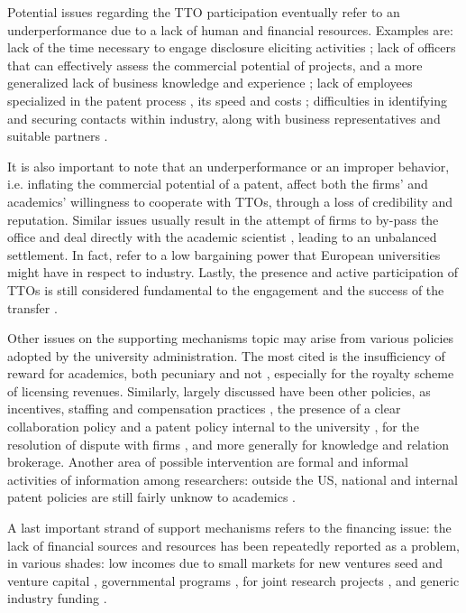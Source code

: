 Potential issues regarding the TTO participation eventually refer to an underperformance due to a lack of human and financial resources. Examples are: lack of the time necessary to engage disclosure eliciting activities \citep{Siegel2007}; lack of officers that can effectively assess the commercial potential of projects, and a more generalized lack of business knowledge and experience \citep{Hertzfeld2006}; lack of employees specialized in the patent process \citep{Baldini2007}, its speed and costs \citep{Fini2009}; difficulties in identifying and securing contacts within industry, along with business representatives \citep{Markman2005} and suitable partners \citep{Muscio2010}.

It is also important to note that an underperformance or an improper behavior, i.e. inflating the commercial potential of a patent, affect both the firms' and academics' willingness to cooperate with TTOs, through a loss of credibility and reputation. Similar issues usually result in the attempt of firms to by-pass the office and deal directly with the academic scientist \citep{Link2007}, leading to an unbalanced settlement. In fact, \citet{Baldini2006} refer to a low bargaining power that European universities might have in respect to industry. Lastly, the presence and active participation of TTOs is still considered fundamental to the engagement and the success of the transfer \citep{Muscio2010}.

Other issues on the supporting mechanisms topic may arise from various policies adopted by the university administration. The most cited is the insufficiency of reward for academics, both pecuniary and not \citep{Siegel2007}, especially for the royalty scheme of licensing revenues. Similarly, largely discussed have been other policies, as incentives, staffing and compensation practices \citep{Baldini2007}, the presence of a clear collaboration policy and a patent policy internal to the university \citep{Muscio2008,Muscio2010,Muscio2013}, for the resolution of dispute with firms \citep{Belenzon2007}, and more generally for knowledge and relation brokerage. Another area of possible intervention are formal and informal activities of information among researchers: outside the US, national and internal patent policies are still fairly unknow to academics \citep{Baldini2006}.

A last important strand of support mechanisms refers to the financing issue: the lack of financial sources and resources has been repeatedly reported as a problem, in various shades: low incomes due to small markets for new ventures \citep{Perez2003} seed and venture capital \citep{Rasmussen2006}, governmental programs \citep{Muscio2008}, for joint research projects \citep{Muscio2010}, and generic industry funding \citep{Muscio2013}.

